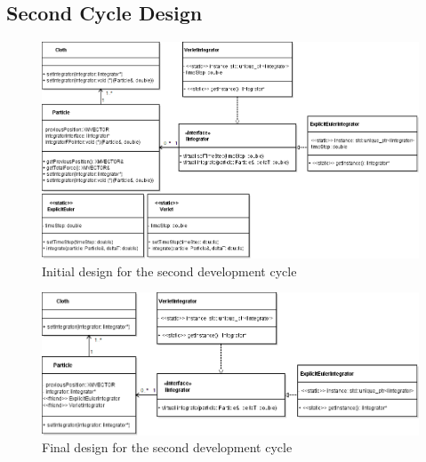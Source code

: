 \begin{landscape}
\section{Second Cycle Design}
  \begin{figure}[!htb]
    \begin{center}
      \includegraphics[scale=0.63]{Figures/cycle_2_initial_design}
    \end{center}
    \caption{Initial design for the second development cycle}
    \label{fig:phase2 initial}
  \end{figure}
  
  \begin{figure}
    \begin{center}
      \includegraphics[scale=0.75]{Figures/cycle_2_final_design}
    \end{center}
    \caption{Final design for the second development cycle}
    \label{fig:phase2}
  \end{figure}
\end{landscape}

